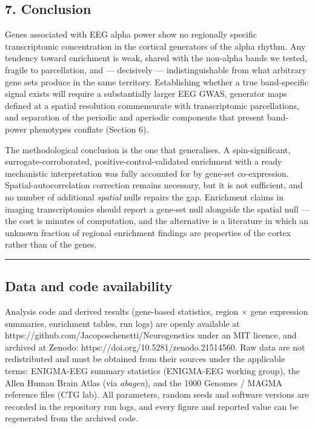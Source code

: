 \documentclass[
  11pt,
  letterpaper,
]{article}
\begin{document}
\subsection{7. Conclusion}\label{conclusion}

Genes associated with EEG alpha power show no regionally specific
transcriptomic concentration in the cortical generators of the alpha
rhythm. Any tendency toward enrichment is weak, shared with the
non-alpha bands we tested, fragile to parcellation, and --- decisively
--- indistinguishable from what arbitrary gene sets produce in the same
territory. Establishing whether a true band-specific signal exists will
require a substantially larger EEG GWAS, generator maps defined at a
spatial resolution commensurate with transcriptomic parcellations, and
separation of the periodic and aperiodic components that present
band-power phenotypes conflate (Section 6).

The methodological conclusion is the one that generalises. A
spin-significant, surrogate-corroborated, positive-control-validated
enrichment with a ready mechanistic interpretation was fully accounted
for by gene-set co-expression. Spatial-autocorrelation correction
remains necessary, but it is not sufficient, and no number of additional
\emph{spatial} nulls repairs the gap. Enrichment claims in imaging
transcriptomics should report a gene-set null alongside the spatial null
--- the cost is minutes of computation, and the alternative is a
literature in which an unknown fraction of regional enrichment findings
are properties of the cortex rather than of the genes.

\begin{center}\rule{0.5\linewidth}{0.5pt}\end{center}

\subsection{Data and code
availability}\label{data-and-code-availability}

Analysis code and derived results (gene-based statistics, region × gene
expression summaries, enrichment tables, run logs) are openly available
at https://github.com/Jacoposchenetti/Neurogenetics under an MIT
licence, and archived at Zenodo:
https://doi.org/10.5281/zenodo.21514560. Raw data are not redistributed
and must be obtained from their sources under the applicable terms:
ENIGMA-EEG summary statistics (ENIGMA-EEG working group), the Allen
Human Brain Atlas (via \emph{abagen}), and the 1000 Genomes / MAGMA
reference files (CTG lab). All parameters, random seeds and software
versions are recorded in the repository run logs, and every figure and
reported value can be regenerated from the archived code.
\end{document}
